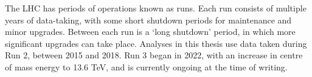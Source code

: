 The \ac{LHC} has periods of operations known as runs. Each run consists of
multiple years of data-taking, with some short shutdown periods for maintenance
and minor upgrades. Between each run is a `long shutdown' period, in which more
significant upgrades can take place. Analyses in this thesis use data taken
during Run 2, between 2015 and 2018. Run 3 began in 2022, with an increase in
centre of mass energy to 13.6 TeV, and is currently ongoing at the time of
writing.
 
